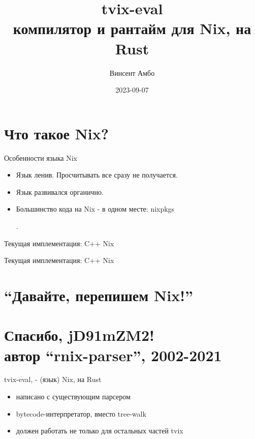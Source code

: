 \documentclass[12pt]{beamer}
\title{tvix-eval \\ компилятор и рантайм для Nix, на Rust}
\date{2023-09-07}
\author{Винсент Амбо}
\institute{TVL}
\newenvironment{code}{\ttfamily}{\par}
\begin{document}
  \begin{frame}
    \begin{center}
      \titlepage
    \end{center}
  \end{frame}

  \section{Что такое Nix?}

  \begin{frame}{Особенности языка Nix}
    \begin{itemize}
    \item Язык ленив. Просчитывать все сразу не получается.
    \item Язык развивался органично.
    \item Большинство кода на Nix - в одном месте: \begin{code}nixpkgs\end{code}.
    \end{itemize}
  \end{frame}

  \begin{frame}{Текущая имплементация: C++ Nix}
    
  \end{frame}

  \begin{frame}{Текущая имплементация: C++ Nix}
    
  \end{frame}

  \section{``Давайте, перепишем Nix!''}

  \section*{Спасибо, jD91mZM2!\\\normalsize{автор ``rnix-parser'', 2002-2021}}

  \begin{frame}{tvix-eval, - (язык) Nix, на Rust}
    \begin{itemize}
    \item написано с существующим парсером
    \item bytecode-интерпретатор, вместо tree-walk
    \item должен работать не только для остальных частей tvix
    \end{itemize}
  \end{frame}
\end{document}
